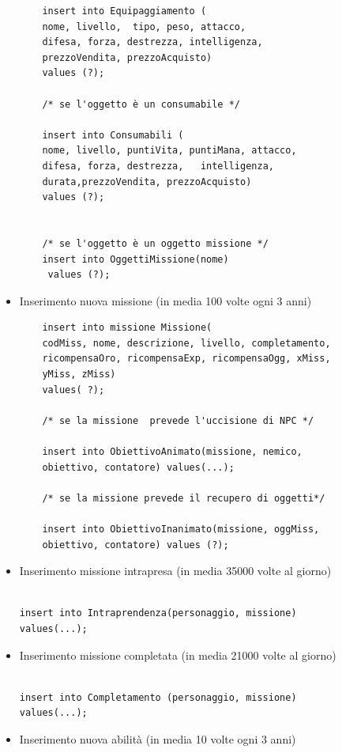 \begin{itemize}
\begin{verbatim}
	insert into Equipaggiamento (
	nome, livello,	tipo, peso, attacco,
	difesa, forza, destrezza, intelligenza,
	prezzoVendita, prezzoAcquisto) 
	values (?);

	/* se l'oggetto è un consumabile */
	
	insert into Consumabili (
	nome, livello, puntiVita, puntiMana, attacco,
	difesa, forza, destrezza, 	intelligenza,
	durata,prezzoVendita, prezzoAcquisto) 
	values (?);


	/* se l'oggetto è un oggetto missione */
	insert into OggettiMissione(nome)
	 values (?);

\end{verbatim}
\item Inserimento nuova missione (in media 100 volte ogni 3 anni)

\begin{verbatim}
	insert into missione Missione(
	codMiss, nome, descrizione, livello, completamento,
	ricompensaOro, ricompensaExp, ricompensaOgg, xMiss,
	yMiss, zMiss)
	values( ?);
	
	/* se la missione  prevede l'uccisione di NPC */
	
	insert into ObiettivoAnimato(missione, nemico,
	obiettivo, contatore) values(...);
	
	/* se la missione prevede il recupero di oggetti*/
	
	insert into ObiettivoInanimato(missione, oggMiss,
	obiettivo, contatore) values (?);

\end{verbatim}

\item Inserimento missione intrapresa (in media 35000 volte al giorno)
\begin{verbatim}

insert into Intraprendenza(personaggio, missione)
values(...);
\end{verbatim}

\item Inserimento missione completata (in media 21000 volte al giorno)

\begin{verbatim}

insert into Completamento (personaggio, missione)
values(...);

\end{verbatim}

\item Inserimento nuova abilità (in media 10 volte ogni 3 anni)

\begin{verbatim}


\end{verbatim}
\end{itemize}
